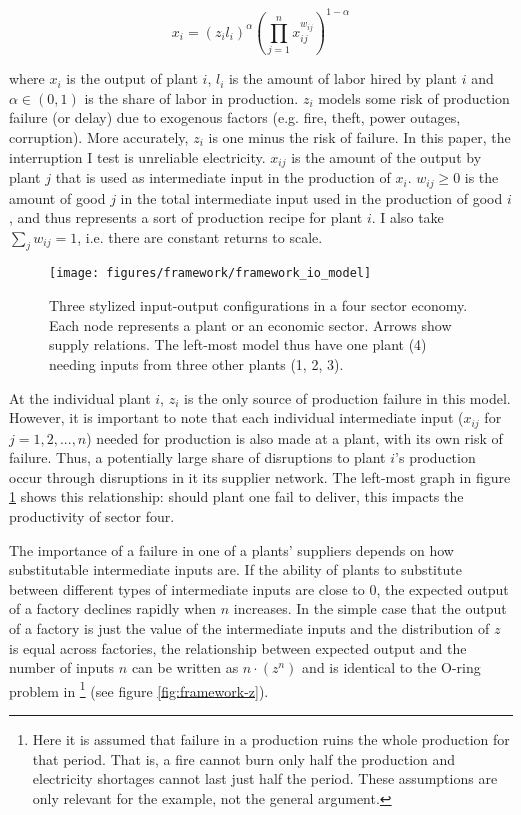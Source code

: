 \documentclass[11pt]{article}
\begin{document}
\[
x_i =  (z_i l_i)^{\alpha}(\prod^{n}_{j = 1} x_{ij}^{w_{ij}})^{1 - \alpha}
\]

where $x_i$ is the output of plant $i$, \(l_i\) is the amount of labor hired by plant \(i\) and \(\alpha \in (0, 1)\) is the share of labor in production. \(z_i\) models some risk of production failure (or delay) due to exogenous factors (e.g. fire, theft, power outages, corruption). More accurately, \(z_i\) is one minus the risk of failure. In this paper, the interruption I test is unreliable electricity. \(x_{ij}\) is the amount of the output by plant \(j\) that is used as intermediate input in the production of \(x_i\). \(w_{ij} \geq 0\) is the amount of good \(j\) in the total intermediate input used in the production of good \(i\), and thus represents a sort of production recipe for plant \(i\). I also take \(\sum_j w_{ij} = 1\), i.e. there are constant returns to scale.

\begin{figure}[htpb]
	\centering
	\texttt{[image: figures/framework/framework\_io\_model]}
	\caption[Three input-output configurations]{Three stylized input-output configurations in a four sector economy. Each node represents a plant or an economic sector. Arrows show supply relations. The left-most model thus have one plant (4) needing inputs from three other plants (1, 2, 3).}%
	\label{fig:framework-io-model}
\end{figure}

At the individual plant \(i\), \(z_i\) is the only source of production failure in this model. However, it is important to note that each individual intermediate input (\(x_{ij}\) for \(j = 1, 2, ..., n\)) needed for production is also made at a plant, with its own risk of failure. Thus, a potentially large share of disruptions to plant $i$'s production occur through disruptions in it its supplier network. The left-most graph in figure \ref{fig:framework-io-model} shows this relationship: should plant one fail to deliver, this impacts the productivity of sector four.

The importance of a failure in one of a plants' suppliers depends on how substitutable intermediate inputs are. If the ability of plants to substitute between different types of intermediate inputs are close to 0, the expected output of a factory declines rapidly when \(n\) increases. In the simple case that the output of a factory is just the value of the intermediate inputs and the distribution of \(z\) is equal across factories, the relationship between expected output and the number of inputs \(n\) can be written as \(n\cdot(z^{n})\) and is identical to the O-ring problem in \cite{kremer_o-ring_1993}\footnote{Here it is assumed that failure in a production ruins the whole production for that period. That is, a fire cannot burn only half the production and electricity shortages cannot last just half the period. These assumptions are only relevant for the example, not the general argument.} (see figure \ref{fig:framework-z}).
\end{document}
